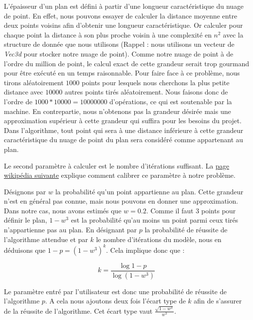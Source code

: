 \documentclass[titlepage,11pt,a4paper]{article}
\begin{document}
\par L'épaisseur d'un plan est défini à partir d'une longueur caractéristique du nuage de point. En effet, nous pouvons essayer de calculer la distance moyenne entre deux points voisins afin d'obtenir une longueur caractéristique. Or calculer pour chaque point la distance à son plus proche voisin à une complexité en $n^2$ avec la structure de donnée que nous utilisons (Rappel : nous utilisons un vecteur de \emph{Vec3d} pour stocker notre nuage de point). Comme notre nuage de point à de l'ordre du million de point, le calcul exact de cette grandeur serait trop gourmand pour être exécuté en un temps raisonnable. Pour faire face à ce problème, nous tirons aléatoirement $1000$ points pour lesquels nous cherchons la plus petite distance avec $10000$ autres points tirés aléatoirement. Nous faisons donc de l'ordre de $1000 * 10 000 = 10 000 000$ d'opérations, ce qui est soutenable par la machine. En contrepartie, nous n'obtenons pas la grandeur désirée mais une approximation supérieur à cette grandeur qui suffira pour les besoins du projet. Dans l'algorithme, tout point qui sera à une distance inférieure à cette grandeur caractéristique du nuage de point du plan sera considéré comme appartenant au plan.

\par Le second paramètre à calculer est le nombre d'itérations suffisant. La \href{https://en.wikipedia.org/wiki/Random_sample_consensus}{page wikipédia suivante} explique comment calibrer ce paramètre à notre problème.

\par Désignons par $w$ la probabilité qu'un point appartienne au plan. Cette grandeur n'est en général pas connue, mais nous pouvons en donner une approximation. Dans notre cas, nous avons estimés que $w = 0.2$. Comme il faut $3$ points pour définir le plan, $1-w^3$ est la probabilité qu'au moins un point parmi ceux tirés n'appartienne pas au plan. En désignant par $p$ la probabilité de réussite de l'algorithme attendue et par $k$ le nombre d'itérations du modèle, nous en déduisons que $1-p = (1-w^3)^k$. Cela implique donc que :

$$k = \frac{\log{1-p}}{\log{(1-w^3)}}$$

\par Le paramètre entré par l'utilisateur est donc une probabilité de réussite de l'algorithme $p$. A cela nous ajoutons deux fois l'écart type de $k$ afin de s'assurer de la réussite de l'algorithme. Cet écart type vaut $\frac{\sqrt{1-w^3}}{w^3}$.
\end{document}
